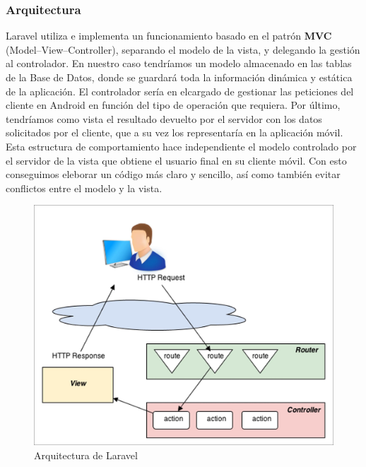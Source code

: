 \subsubsection{Arquitectura}

Laravel utiliza e implementa un funcionamiento basado en el patrón \textbf{MVC} (Model–View–Controller), separando el modelo de la vista, y delegando la gestión al controlador. En nuestro caso tendríamos un modelo almacenado en las tablas de la Base de Datos, donde se guardará toda la información dinámica y estática de la aplicación. El controlador sería en elcargado de gestionar las peticiones del cliente en Android en función del tipo de operación que requiera. Por último, tendríamos como vista el resultado devuelto por el servidor con los datos solicitados por el cliente, que a su vez los representaría en la aplicación móvil. Esta estructura de comportamiento hace independiente el modelo controlado por el servidor de la vista que obtiene el usuario final en su cliente móvil. Con esto conseguimos eleborar un código más claro y sencillo, así como también evitar conflictos entre el modelo y la vista.

\begin{figure}[!]
\centering
\includegraphics[keepaspectratio, scale=0.8]{Media/Captures/laravelArch.jpg}
\caption{Arquitectura de Laravel}
\label{fig:laravelArch}
\end{figure}

